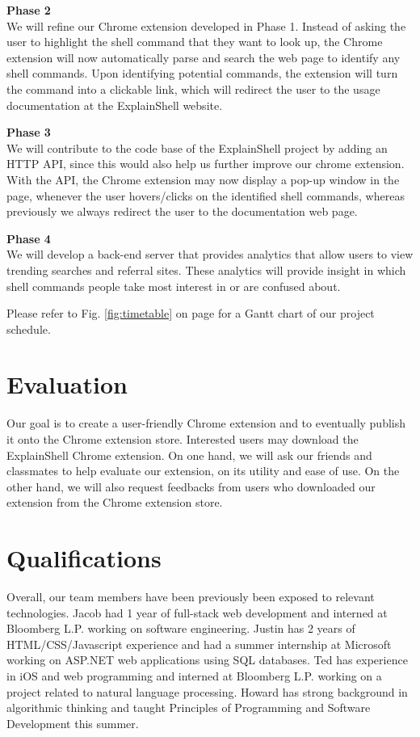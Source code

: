 \documentclass[11pt]{article}
\begin{document}
\par{\bf Phase 2}\\
We will refine our Chrome extension developed in Phase 1. Instead of asking the user to highlight the shell command that they want to look up, the Chrome extension will now automatically parse and search the web page to identify any shell commands. Upon identifying potential commands, the extension will turn the command into a clickable link, which will redirect the user to the usage documentation at the ExplainShell website.

\par{\bf Phase 3}\\
We will contribute to the code base of the ExplainShell project by adding an HTTP API, since this would also help us further improve our chrome extension. With the API, the Chrome extension may now display a pop-up window in the page, whenever the user hovers/clicks on the identified shell commands, whereas previously we always redirect the user to the documentation web page.

\par{\bf Phase 4}\\
We will develop a back-end server that provides analytics that allow users to view trending searches and referral sites. These analytics will provide insight in which shell commands people take most interest in or are confused about.

Please refer to Fig. \ref{fig:timetable} on page \pageref{fig:timetable} for a Gantt chart of our project schedule.

\section{Evaluation}

Our goal is to create a user-friendly Chrome extension and to eventually publish it onto the Chrome extension store. Interested users may download the ExplainShell Chrome extension. On one hand, we will ask our friends and classmates to help evaluate our extension, on its utility and ease of use. On the other hand, we will also request feedbacks from users who downloaded our extension from the Chrome extension store.

\section{Qualifications}

Overall, our team members have been previously been exposed to relevant technologies. Jacob had 1 year of full-stack web development and interned at Bloomberg L.P. working on software engineering. Justin has 2 years of HTML/CSS/Javascript experience and had a summer internship at Microsoft working on ASP.NET web applications using SQL databases. Ted has experience in iOS and web programming and interned at Bloomberg L.P. working on a project related to natural language processing. Howard has strong background in algorithmic thinking and taught Principles of Programming and Software Development this summer. 
\end{document}
